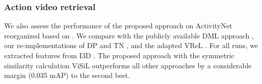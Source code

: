 \documentclass[10pt,twocolumn,letterpaper]{article}
\begin{document}
\subsubsection{Action video retrieval}
\label{sec:avr}

We also assess the performance of the proposed approach on ActivityNet \cite{caba2015} reorganized based on \cite{feng2018}. We compare with the publicly available DML approach  \cite{kordopatis2017b}, our re-implementations of DP \cite{chou2015} and TN \cite{tan2009}, and the adapted VReL \cite{feng2018}. For all runs, we extracted features from I3D \cite{carreira2017}. The proposed approach with the symmetric similarity calculation ViSiL outperforms all other approaches by a considerable margin (0.035 mAP) to the second best. 

\begin{table}[t]
  \centering
  \caption {mAP comparison of three ViSiL setups and state-of-the-art methods on the three tasks of FIVR-200K.}
  \label{tab:fivr}
\end{table}
\end{document}
